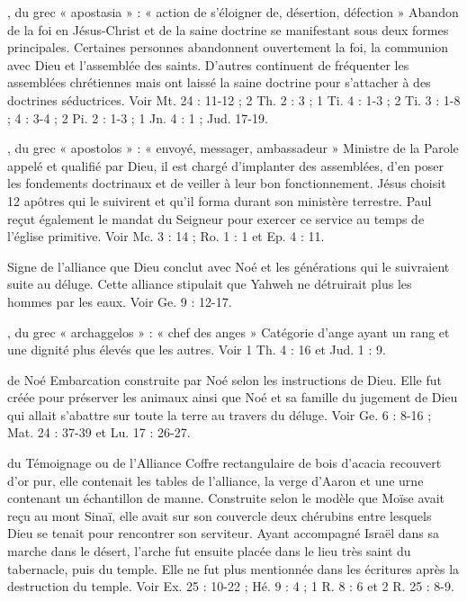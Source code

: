\begin{multicols}{2}
, du grec « apostasia » : « action de s'éloigner de, désertion, défection »
Abandon de la foi en Jésus-Christ et de la saine doctrine se manifestant sous deux formes principales. Certaines personnes abandonnent ouvertement la foi, la communion avec Dieu et l’assemblée des saints. D’autres continuent de fréquenter les assemblées chrétiennes mais ont laissé la saine doctrine pour s’attacher à des doctrines séductrices. Voir Mt. 24 : 11-12 ; 2 Th. 2 : 3 ; 1 Ti. 4 : 1-3 ; 2 Ti. 3 : 1-8 ; 4 : 3-4 ; 2 Pi. 2 : 1-3 ; 1 Jn. 4 : 1 ; Jud. 17-19.

, du grec « apostolos » : « envoyé, messager, ambassadeur »
Ministre de la Parole appelé et qualifié par Dieu, il est chargé d’implanter des assemblées, d’en poser les fondements doctrinaux et de veiller à leur bon fonctionnement. Jésus choisit 12 apôtres qui le suivirent et qu’il forma durant son ministère terrestre. Paul reçut également le mandat du Seigneur pour exercer ce service au temps de l’église primitive. Voir Mc. 3 : 14 ; Ro. 1 : 1 et Ep. 4 : 11.

Signe de l’alliance que Dieu conclut avec Noé et les générations qui le suivraient suite au déluge. Cette alliance stipulait que Yahweh ne détruirait plus les hommes par les eaux. Voir Ge. 9 : 12-17.

, du grec « archaggelos » : « chef des anges »
Catégorie d’ange ayant un rang et une dignité plus élevés que les autres. Voir 1 Th. 4 : 16 et Jud. 1 : 9.

de Noé
Embarcation construite par Noé selon les instructions de Dieu. Elle fut créée pour préserver les animaux ainsi que Noé et sa famille du jugement de Dieu qui allait s’abattre sur toute la terre au travers du déluge. Voir Ge. 6 : 8-16 ; Mat. 24 : 37-39 et Lu. 17 : 26-27.

du Témoignage ou de l'Alliance
Coffre rectangulaire de bois d’acacia recouvert d’or pur, elle contenait les tables de l'alliance, la verge d'Aaron et une urne contenant un échantillon de manne. Construite selon le modèle que Moïse avait reçu au mont Sinaï, elle avait sur son couvercle deux chérubins entre lesquels Dieu se tenait pour rencontrer son serviteur. Ayant accompagné Israël dans sa marche dans le désert, l’arche fut ensuite placée dans le lieu très saint du tabernacle, puis du temple. Elle ne fut plus mentionnée dans les écritures après la destruction du temple. Voir Ex. 25 : 10-22 ; Hé. 9 : 4 ; 1 R. 8 : 6 et 2 R. 25 : 8-9.


\end{multicols}
